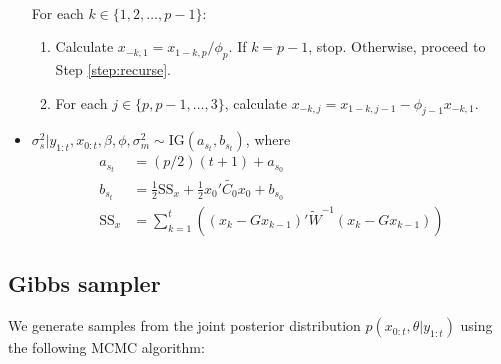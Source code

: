 \documentclass{article}
\begin{document}
\begin{itemize}
\\
For each $k \in \{1,2,\ldots,p-1\}$:
\begin{enumerate}
\item Calculate $x_{-k,1} = x_{1-k,p} / \phi_p$. If $k = p - 1$, stop. Otherwise, proceed to Step \ref{step:recurse}.
\item For each $j \in \{p,p-1,\ldots,3\}$, calculate $x_{-k,j} = x_{1-k,j-1} - \phi_{j-1}x_{-k,1}$. \label{step:recurse}
\end{enumerate}
\item $\sigma^2_s|y_{1:t},x_{0:t},\beta,\phi,\sigma^2_m \sim \mbox{IG}(a_{s_t}, b_{s_t})$, where
\begin{align*}
a_{s_t} &= (p/2)(t+1) + a_{s_0} \\
b_{s_t} &= \frac{1}{2}\mbox{SS}_x + \frac{1}{2}x_0'\tilde{C_0}x_0 + b_{s_0} \\
\mbox{SS}_x &= \sum^t_{k=1} \left((x_k - Gx_{k-1})'\tilde{W}^{-1}(x_k - Gx_{k-1})\right)
\end{align*}
\end{itemize}

\subsection{Gibbs sampler}

We generate samples from the joint posterior distribution $p(x_{0:t},\theta|y_{1:t})$ using the following MCMC algorithm:
\end{document}
